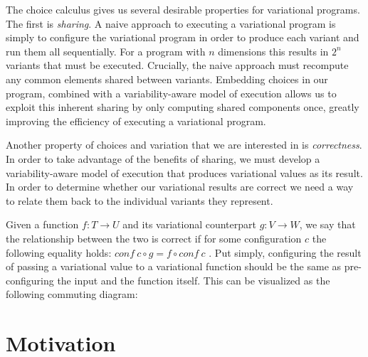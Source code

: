 \documentclass[letterpaper,10pt,onecolumn]{article}
\begin{document}
The choice calculus gives us several desirable properties for variational programs.
The first is \emph{sharing}. A naive approach to executing a variational program is simply to
configure the variational program in order to produce each variant and run them all sequentially.
For a program with $n$ dimensions this results in $2^n$ variants that must be executed. Crucially,
the naive approach must recompute any common elements shared between variants. Embedding
choices in our program, combined with a variability-aware model of execution allows us to exploit this
inherent sharing by only computing shared components once, greatly improving the efficiency of
executing a variational program.

Another property of choices and variation that we are interested in is \emph{correctness}. In order
to take advantage of the benefits of sharing, we must develop a variability-aware model of execution
that produces variational values as its result. In order to determine whether our variational results
are correct we need a way to relate them back to the individual variants they represent.

Given a function $f : T \rightarrow U$ and its variational counterpart $g : V \rightarrow W$, we say that
the relationship between the two is correct if for some configuration $c$ the following equality holds:
$conf\ c \circ g = f \circ conf\ c$ \cite{hubbard2016formula}. Put simply, configuring the result
of passing a variational value to a variational function should be the same as pre-configuring the input
and the function itself. This can be visualized as the following commuting diagram:

\begin{center}
\end{center}

\section{Motivation}
\end{document}

